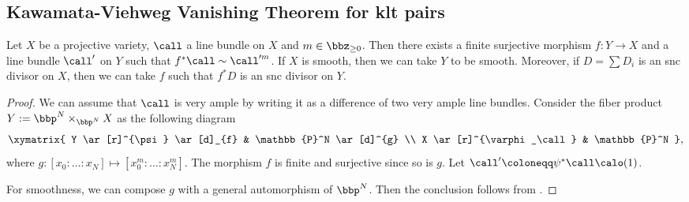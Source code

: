 \subsection{Kawamata-Viehweg Vanishing Theorem for klt pairs}

    \begin{lemma}\label{lem: divide a divisor by a finite surjective morphism}
        Let \(X\) be a projective variety, \(\call\) a line bundle on \(X\) and \(m \in \bbz_{\geq 0}\).
        Then there exists a finite surjective morphism \(f: Y \to X\) and a line bundle \(\call'\) on \(Y\) such that \(f^*\call \sim \call'^{m}\).
        If \(X\) is smooth, then we can take \(Y\) to be smooth.
        Moreover, if \(D = \sum D_i\) is an snc divisor on \(X\), then we can take \(f\) such that \(f^*D\) is an snc divisor on \(Y\).
    \end{lemma}
    \begin{proof}
        We can assume that \(\call\) is very ample by writing it as a difference of two very ample line bundles.
        Consider the fiber product \(Y:= \bbp^N \times_{\bbp^N} X\) as the following diagram
        \[ \xymatrix{
            Y \ar[r]^{\psi} \ar[d]_{f} & \mathbb{P}^N \ar[d]^{g} \\
            X \ar[r]^{\varphi_\call} & \mathbb{P}^N
        }, \]
        where \(g: [x_0: \ldots: x_N] \mapsto [x_0^m: \ldots: x_N^m]\).
        The morphism \(f\) is finite and surjective since so is \(g\).
        Let \(\call'\coloneqq \psi^*\call\calo(1)\).

        For smoothness, we can compose \(g\) with a general automorphism of \(\bbp^N\).
        Then the conclusion follows from \cite[Chapter III, Theorem 10.8]{Har77}.
    \end{proof}


